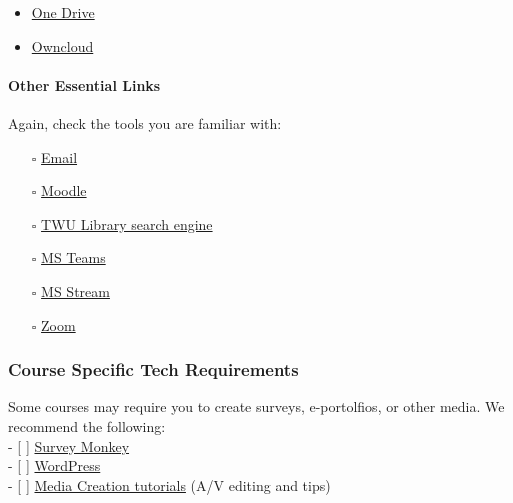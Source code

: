 \documentclass[
]{book}
\theoremstyle{definition}
\theoremstyle{definition}
\theoremstyle{definition}
\theoremstyle{definition}
\theoremstyle{remark}
\begin{document}
\begin{itemize}
\item
  \href{https://trinitywestern.teamdynamix.com/TDClient/1904/Portal/KB/ArticleDet?ID=71260}{One Drive}
\item
  \href{https://trinitywestern.teamdynamix.com/TDClient/1904/Portal/KB/ArticleDet?ID=15681}{Owncloud}
\end{itemize}

\hypertarget{other-essential-links}{%
\paragraph*{Other Essential Links}\label{other-essential-links}}

Again, check the tools you are familiar with:

\begin{itemize}
\item[$\square$]
  \href{https://trinitywestern.teamdynamix.com/TDClient/1904/Portal/KB/?CategoryID=3351}{Email}
\item[$\square$]
  \href{https://trinitywestern.teamdynamix.com/TDClient/1904/Portal/KB/?CategoryID=8214}{Moodle}
\item[$\square$]
  \href{https://trinitywestern.teamdynamix.com/TDClient/1904/Portal/KB/ArticleDet?ID=15050}{TWU Library search engine}
\item[$\square$]
  \href{https://trinitywestern.teamdynamix.com/TDClient/1904/Portal/KB/?CategoryID=17821\&SIDs=11353}{MS Teams}
\item[$\square$]
  \href{https://trinitywestern.teamdynamix.com/TDClient/1904/Portal/KB/?CategoryID=23454}{MS Stream}
\item[$\square$]
  \href{https://trinitywestern.teamdynamix.com/TDClient/1904/Portal/KB/?CategoryID=17478}{Zoom}
\end{itemize}

\hypertarget{course-specific-tech-requirements}{%
\subsubsection*{Course Specific Tech Requirements}\label{course-specific-tech-requirements}}

Some courses may require you to create surveys, e-portolfios, or other media. We recommend the following:\\
- {[} {]} \href{https://trinitywestern.teamdynamix.com/TDClient/1904/Portal/KB/ArticleDet?ID=47076}{Survey Monkey}\\
- {[} {]} \href{https://trinitywestern.teamdynamix.com/TDClient/1904/Portal/KB/?CategoryID=4746}{WordPress}\\
- {[} {]} \href{https://trinitywestern.teamdynamix.com/TDClient/1904/Portal/KB/?CategoryID=6940}{Media Creation tutorials} (A/V editing and tips)
\end{document}
